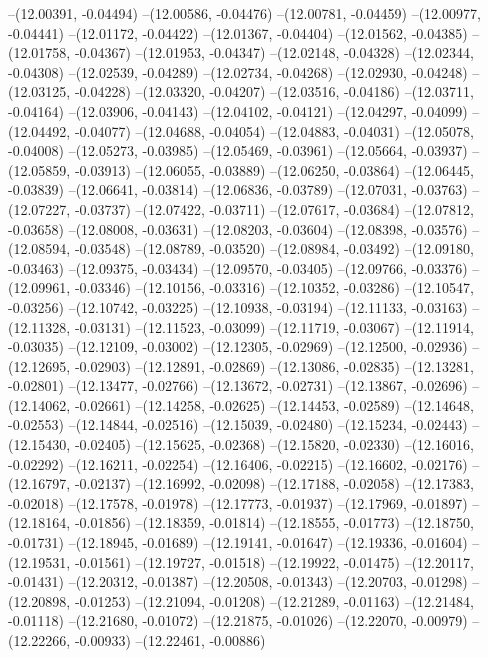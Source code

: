 --(12.00391, -0.04494)
--(12.00586, -0.04476)
--(12.00781, -0.04459)
--(12.00977, -0.04441)
--(12.01172, -0.04422)
--(12.01367, -0.04404)
--(12.01562, -0.04385)
--(12.01758, -0.04367)
--(12.01953, -0.04347)
--(12.02148, -0.04328)
--(12.02344, -0.04308)
--(12.02539, -0.04289)
--(12.02734, -0.04268)
--(12.02930, -0.04248)
--(12.03125, -0.04228)
--(12.03320, -0.04207)
--(12.03516, -0.04186)
--(12.03711, -0.04164)
--(12.03906, -0.04143)
--(12.04102, -0.04121)
--(12.04297, -0.04099)
--(12.04492, -0.04077)
--(12.04688, -0.04054)
--(12.04883, -0.04031)
--(12.05078, -0.04008)
--(12.05273, -0.03985)
--(12.05469, -0.03961)
--(12.05664, -0.03937)
--(12.05859, -0.03913)
--(12.06055, -0.03889)
--(12.06250, -0.03864)
--(12.06445, -0.03839)
--(12.06641, -0.03814)
--(12.06836, -0.03789)
--(12.07031, -0.03763)
--(12.07227, -0.03737)
--(12.07422, -0.03711)
--(12.07617, -0.03684)
--(12.07812, -0.03658)
--(12.08008, -0.03631)
--(12.08203, -0.03604)
--(12.08398, -0.03576)
--(12.08594, -0.03548)
--(12.08789, -0.03520)
--(12.08984, -0.03492)
--(12.09180, -0.03463)
--(12.09375, -0.03434)
--(12.09570, -0.03405)
--(12.09766, -0.03376)
--(12.09961, -0.03346)
--(12.10156, -0.03316)
--(12.10352, -0.03286)
--(12.10547, -0.03256)
--(12.10742, -0.03225)
--(12.10938, -0.03194)
--(12.11133, -0.03163)
--(12.11328, -0.03131)
--(12.11523, -0.03099)
--(12.11719, -0.03067)
--(12.11914, -0.03035)
--(12.12109, -0.03002)
--(12.12305, -0.02969)
--(12.12500, -0.02936)
--(12.12695, -0.02903)
--(12.12891, -0.02869)
--(12.13086, -0.02835)
--(12.13281, -0.02801)
--(12.13477, -0.02766)
--(12.13672, -0.02731)
--(12.13867, -0.02696)
--(12.14062, -0.02661)
--(12.14258, -0.02625)
--(12.14453, -0.02589)
--(12.14648, -0.02553)
--(12.14844, -0.02516)
--(12.15039, -0.02480)
--(12.15234, -0.02443)
--(12.15430, -0.02405)
--(12.15625, -0.02368)
--(12.15820, -0.02330)
--(12.16016, -0.02292)
--(12.16211, -0.02254)
--(12.16406, -0.02215)
--(12.16602, -0.02176)
--(12.16797, -0.02137)
--(12.16992, -0.02098)
--(12.17188, -0.02058)
--(12.17383, -0.02018)
--(12.17578, -0.01978)
--(12.17773, -0.01937)
--(12.17969, -0.01897)
--(12.18164, -0.01856)
--(12.18359, -0.01814)
--(12.18555, -0.01773)
--(12.18750, -0.01731)
--(12.18945, -0.01689)
--(12.19141, -0.01647)
--(12.19336, -0.01604)
--(12.19531, -0.01561)
--(12.19727, -0.01518)
--(12.19922, -0.01475)
--(12.20117, -0.01431)
--(12.20312, -0.01387)
--(12.20508, -0.01343)
--(12.20703, -0.01298)
--(12.20898, -0.01253)
--(12.21094, -0.01208)
--(12.21289, -0.01163)
--(12.21484, -0.01118)
--(12.21680, -0.01072)
--(12.21875, -0.01026)
--(12.22070, -0.00979)
--(12.22266, -0.00933)
--(12.22461, -0.00886)
